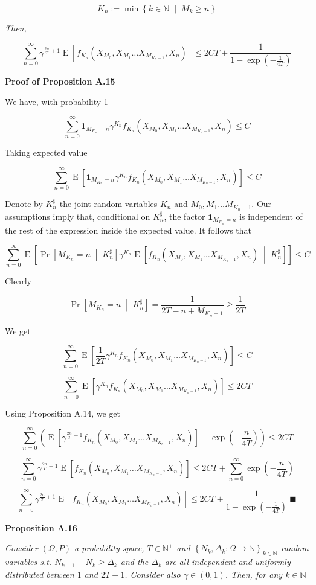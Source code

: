 \documentclass[a4paper]{article}
\newcommand{\Co}[1]{}
\newcommand{\AP}[1]{\left(#1\right)}
\newcommand{\AB}[1]{\left[#1\right]}
\newcommand{\AC}[1]{\left\{#1\right\}}
\newcommand{\ABM}[2]{\left[#1\;\middle\vert\;#2\right]}
\newcommand{\ACM}[2]{\left\{#1\;\middle\vert\;#2\right\}}
\newcommand{\CP}[3]{\underset{#1}{\operatorname{Pr}}\ABM{#2}{#3}}
\newcommand{\E}[1]{\operatorname{E}\AB{#1}}
\newcommand{\CE}[3]{\underset{#1}{\operatorname{E}}\ABM{#2}{#3}}
\newcommand{\Nats}{\mathbb{N}}
\newcommand{\KD}[1]{\boldsymbol{1}_{#1}}
\begin{document}
$$K_n:=\min\ACM{k\in\Nats}{M_k\geq n}$$

\textit{Then,}\Co{i}

$$\sum_{n=0}^\infty\gamma^{\frac{2n}{T}+1}\E{f_{K_n}\AP{X_{M_0},X_{M_1}\ldots X_{M_{K_n-1}},X_n}}\leq 2CT+\frac{1}{1-\exp\AP{-\frac{1}{4T}}}$$

\textbf{Proof of Proposition A.15}\Co{b}

We have, with probability 1

$$\sum_{n=0}^\infty\KD{M_{K_n}=n}\gamma^{K_n}f_{K_n}\AP{X_{M_0},X_{M_1}\ldots X_{M_{K_n-1}},X_n} \leq C$$

Taking expected value

$$\sum_{n=0}^\infty\E{\KD{M_{K_n}=n}\gamma^{K_n}f_{K_n}\AP{X_{M_0},X_{M_1}\ldots X_{M_{K_n-1}},X_n}} \leq C$$

Denote by $K_n^\sharp$ the joint random variables $K_n$ and $M_0,M_1\ldots M_{K_n-1}$. Our assumptions imply that, conditional on $K_n^\sharp$, the factor $\KD{M_{K_n}=n}$ is independent of the rest of the expression inside the expected value. It follows that

$$\sum_{n=0}^\infty\E{\CP{}{M_{K_n}=n}{K_n^\sharp}\gamma^{K_n}\CE{}{f_{K_n}\AP{X_{M_0},X_{M_1}\ldots X_{M_{K_n-1}},X_n}}{K_n^\sharp}} \leq C$$

Clearly

$$\CP{}{M_{K_n}=n}{K_n^\sharp}=\frac{1}{2T-n+M_{K_n-1}}\geq\frac{1}{2T}$$

We get

$$\sum_{n=0}^\infty\E{\frac{1}{2T}\gamma^{K_n}f_{K_n}\AP{X_{M_0},X_{M_1}\ldots X_{M_{K_n-1}},X_n}} \leq C$$

$$\sum_{n=0}^\infty\E{\gamma^{K_n}f_{K_n}\AP{X_{M_0},X_{M_1}\ldots X_{M_{K_n-1}},X_n}} \leq 2CT$$

Using Proposition A.14, we get

$$\sum_{n=0}^\infty\AP{\E{\gamma^{\frac{2n}{T}+1}f_{K_n}\AP{X_{M_0},X_{M_1}\ldots X_{M_{K_n-1}},X_n}}-\exp\AP{-\frac{n}{4T}}} \leq 2CT$$

$$\sum_{n=0}^\infty\gamma^{\frac{2n}{T}+1}\E{f_{K_n}\AP{X_{M_0},X_{M_1}\ldots X_{M_{K_n-1}},X_n}} \leq 2CT+\sum_{n=0}^\infty\exp\AP{-\frac{n}{4T}}$$

$$\sum_{n=0}^\infty\gamma^{\frac{2n}{T}+1}\E{f_{K_n}\AP{X_{M_0},X_{M_1}\ldots X_{M_{K_n-1}},X_n}} \leq 2CT+\frac{1}{1-\exp\AP{-\frac{1}{4T}}}\ \blacksquare$$

\textbf{Proposition A.16}\Co{b}

\textit{Consider $(\Omega,P)$ a probability space, $T\in\Nats^+$ and $\AC{N_k,\Delta_k:\Omega\rightarrow\Nats}_{k\in\Nats}$ random variables s.t. $N_{k+1}-N_k\geq\Delta_k$ and the $\Delta_k$ are all independent and uniformly distributed between $1$ and $2T-1$. Consider also $\gamma\in(0,1)$. Then, for any $k\in\Nats$}\Co{i}
\end{document}
